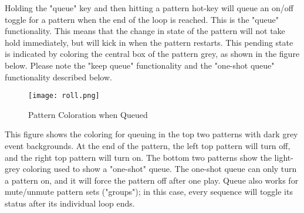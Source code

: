 

   Holding the "queue" key and then hitting a pattern hot-key
   will queue an on/off toggle for a pattern when the end of the loop is
   reached.
   This is the "queue" functionality.
   This means that the change in state of the pattern will not take hold
   immediately, but will kick in when the pattern restarts.
   This pending state is indicated by coloring the central box of the
   pattern grey, as shown in the figure below.
   Please note the "keep queue" functionality and
   the "one-shot queue" functionality described below.

\begin{figure}[H]
   \centering 
   \texttt{[image: roll.png]}
   \caption{Pattern Coloration when Queued}
   \label{fig:queueing_coloration}
\end{figure}

   This figure shows the coloring for queuing in the top two patterns with
   dark grey event backgrounds.  At the end of the pattern, the left top
   pattern will turn off, and the right top pattern will turn on.
   The bottom two patterns show the light-grey coloring used to show
   a "one-shot" queue.  The one-shot queue can only turn a pattern on, and it
   will force the pattern off after one play.
   Queue also works for mute/unmute pattern sets ("groups"); in this case,
   every sequence will toggle its status after its individual loop ends. 

